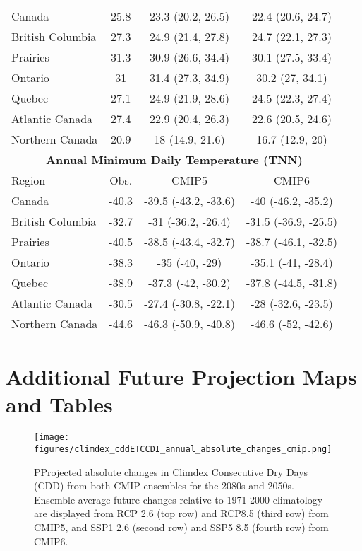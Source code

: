 \documentclass[]{scrartcl}
\begin{document}
\begin{appendices}
\begin{table}[t]
\begin{center}
\begin{tabular}{|l|ccc|}
			\hline
			Canada & 25.8 & 23.3 (20.2, 26.5) & 22.4 (20.6, 24.7) \\ 
			British Columbia & 27.3 & 24.9 (21.4, 27.8) & 24.7 (22.1, 27.3) \\ 
			Prairies & 31.3 & 30.9 (26.6, 34.4) & 30.1 (27.5, 33.4) \\ 
			Ontario & 31 & 31.4 (27.3, 34.9) & 30.2 (27, 34.1) \\ 
			Quebec & 27.1 & 24.9 (21.9, 28.6) & 24.5 (22.3, 27.4) \\ 
			Atlantic Canada & 27.4 & 22.9 (20.4, 26.3) & 22.6 (20.5, 24.6) \\ 
			Northern Canada & 20.9 & 18 (14.9, 21.6) & 16.7 (12.9, 20) \\ 
			\hline	
			\multicolumn{4}{|c|}{\textbf{Annual Minimum Daily Temperature (TNN)}} \\
			\hline
			Region & Obs. & CMIP5 & CMIP6   \\
			\hline
			Canada & -40.3 & -39.5 (-43.2, -33.6) & -40 (-46.2, -35.2) \\ 
			British Columbia & -32.7 & -31 (-36.2, -26.4) & -31.5 (-36.9, -25.5) \\ 
			Prairies & -40.5 & -38.5 (-43.4, -32.7) & -38.7 (-46.1, -32.5) \\ 
			Ontario & -38.3 & -35 (-40, -29) & -35.1 (-41, -28.4) \\ 
			Quebec & -38.9 & -37.3 (-42, -30.2) & -37.8 (-44.5, -31.8) \\ 
			Atlantic Canada & -30.5 & -27.4 (-30.8, -22.1) & -28 (-32.6, -23.5) \\ 
			Northern Canada & -44.6 & -46.3 (-50.9, -40.8) & -46.6 (-52, -42.6) \\ 
			\hline	
		\end{tabular}
	\end{center}
\end{table}

\clearpage

\section{Additional Future Projection Maps and Tables}\label{added_proj}
	
\begin{figure}[ht!]
	\centering
	\texttt{[image: figures/climdex\_cddETCCDI\_annual\_absolute\_changes\_cmip.png]}
	\caption[CDD]{PProjected absolute changes in Climdex Consecutive Dry Days (CDD) from both CMIP ensembles for the 2080s and 2050s. Ensemble average future changes relative to 1971-2000 climatology are displayed from RCP 2.6 (top row) and RCP8.5 (third row) from CMIP5, and SSP1 2.6 (second row) and SSP5 8.5 (fourth row) from CMIP6.}
	\label{fig:climdex_cdd_future}
\end{figure}


\end{appendices}
\end{document}
